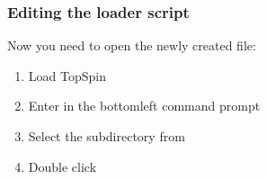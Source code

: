\documentclass[letterpaper,10pt,english]{sphinxmanual}
\begin{document}
\subsubsection{Editing the loader script}
\label{\detokenize{gui/topspin_install:editing-the-loader-script}}
\sphinxAtStartPar
Now you need to open the newly created file:
\begin{enumerate}
%
\item {} 
\sphinxAtStartPar
Load TopSpin

\item {} 
\sphinxAtStartPar
Enter  in the bottom\sphinxhyphen{}left command prompt

\item {} 
\sphinxAtStartPar
Select the  subdirectory from 

\item {} 
\sphinxAtStartPar
Double click 

\end{enumerate}
\end{document}
